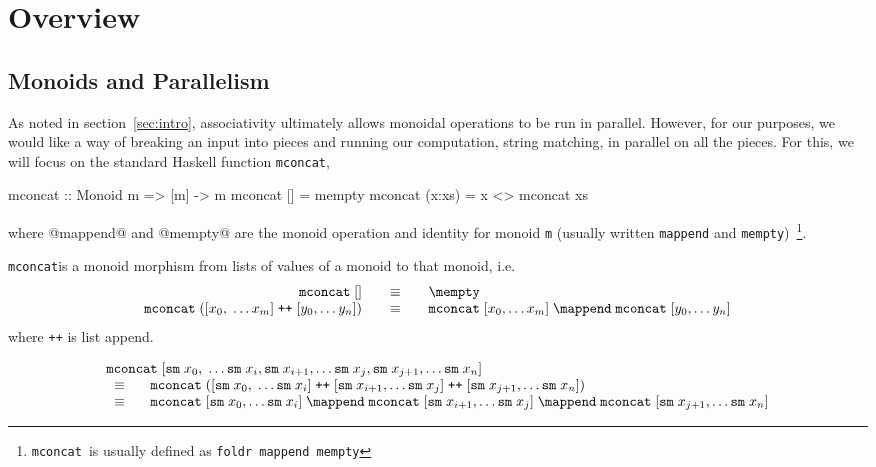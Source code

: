 \section{Overview}\label{sec:overviews}

\def\sm{\texttt{sm}}
\def\mc{\texttt{mconcat}}

\subsection{Monoids and Parallelism}\label{subsec:monoids}

As noted in section~\ref{sec:intro}, associativity ultimately
allows monoidal operations to be run in parallel. However, for our
purposes, we would like a way of breaking an input into pieces and
running our computation, string matching, in parallel on all the
pieces. For this, we will focus on the standard Haskell function \mc,
\begin{code}
  mconcat :: Monoid m => [m] -> m
  mconcat [] = mempty
  mconcat (x:xs) = x <> mconcat xs
\end{code}
where @mappend@ and @mempty@ are the monoid operation and identity for
monoid \texttt{m} (usually written \texttt{mappend} and
\texttt{mempty})~\footnote{\mc\, is usually defined as \texttt{foldr mappend mempty}}.

\mc is a monoid morphism from lists of values of
a monoid to that monoid, i.e.
%
$$
\begin{array}{rcl}
\mc\;[] & \quad \equiv \quad & \mempty \\
\mc\;([x_0,\;\ldots x_m]\;\texttt{++}\;[y_0,\ldots y_n])
& \quad \equiv \quad &
\mc\;[x_0, \ldots x_m]\;\mappend\;\mc\;[y_0,\ldots y_n]
\end{array}
$$
%
where \texttt{++} is list append.

$$
\begin{array}{l}
\mc\;[\sm\;x_0,\;\ldots \sm\;x_i, \sm\;x_{i+1},\ldots \sm\;x_j, \sm\;x_{j+1},\ldots \sm\;x_n] \\
\;\;\equiv\;\; \quad
\mc\;([\sm\;x_0,\;\ldots \sm\;x_i]\;\texttt{++}\;[\sm\;x_{i+1},\ldots \sm\;x_j]\;\texttt{++}\;[\sm\;x_{j+1},\ldots \sm\;x_n]) \\
\;\;\equiv\;\; \quad
\mc\;[\sm\;x_0, \ldots \sm\;x_i]\;\mappend\;\mc\;[\sm\;x_{i+1},\ldots \sm\;x_j]\;\mappend\;\mc\;[\sm\;x_{j+1},\ldots \sm\;x_n]
\end{array}
$$



